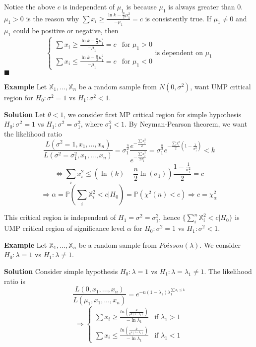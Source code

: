 Notice the above $c$ is independent of $\mu_1$ is because $\mu_1$ is always greater than 0. $\mu_1 > 0$ is the reason why $\sum x_i \geq \frac{\ln k - \frac{n}{2}\mu_1^2}{-\mu_1} = c$ is consistently true. If $\mu_1 \neq 0$ and $\mu_1$ could be positive or negative, then
$$\begin{cases}
\sum x_i \geq \frac{\ln k - \frac{n}{2}\mu_1^2}{-\mu_1} = c & \text{for } \mu_1 >  0 \\
\sum x_i \leq \frac{\ln k - \frac{n}{2}\mu_1^2}{-\mu_1} = c & \text{for } \mu_1 <  0
\end{cases} \text{is dependent on } \mu_1$$
$\blacksquare$

\textbf{Example} Let $\mathbb{X}_1, ..., \mathbb{X}_n$ be a random sample from $N(0, \sigma^2)$, want UMP critical region for $H_0: \sigma^2 = 1$ vs $H_1: \sigma^2 < 1$.

\textbf{Solution} Let $\theta < 1$, we consider first MP critical region for simple hypothesis $H_0: \sigma^2 = 1$ vs $H_1: \sigma^2 = \sigma_1^2$, where $\sigma_1^2 < 1$. By Neyman-Pearson theorem, we want the likelihood ratio
$$\frac{L(\sigma^2 = 1, x_1, ..., x_n)}{L(\sigma^2 = \sigma_1^2, x_1, ..., x_n)} = \sigma_1^{\frac{n}{2}}\frac{e^{-\frac{\sum x_i^2}{2}}}{e^{-\frac{\sum x_i^2}{2\sigma_1^2}}}
= \sigma_1^{\frac{n}{2}} e^{-\frac{\sum x_i^2}{2} (1-\frac{1}{\sigma_1^2})} < k$$
$$\iff \sum_i x_i^2 \leq (\ln(k) - \frac{n}{2}\ln(\sigma_1)) \frac{1-\frac{1}{\sigma_1^2}}{2} = c$$
$$\Rightarrow \alpha = \mathbb{P}(\sum_i \mathbb{X}_i^2 < c | H_0) = \mathbb{P}(\chi^2(n) < c ) \Rightarrow c = \chi^2_\alpha$$

This critical region is independent of $H_1 = \sigma^2 = \sigma_1^2$, hence $\{ \sum_i^n \mathbb{X}_i^2 < c | H_0 \}$ is UMP critical region of significance level $\alpha$ for $H_0: \sigma^2 = 1$ vs $H_1: \sigma^2 < 1$.

\textbf{Example} Let $\mathbb{X}_1, ..., \mathbb{X}_n$ be a random sample from $Poisson(\lambda)$. We consider $H_0: \lambda = 1$ vs $H_1: \lambda \neq 1$.

\textbf{Solution} Consider simple hypothesis $H_0: \lambda = 1$ vs $H_1: \lambda = \lambda_1 \neq 1$. The likelihood ratio is
$$\frac{L(0, x_1, ..., x_n)}{L(\mu_1, x_1, ..., x_n)} = e^{-n(1-\lambda_1) \lambda_1^{\sum x_i \leq k}}$$
$$\Rightarrow
\begin{cases}
\sum x_i \geq \frac{ln(\frac{k}{e^{n(1-\lambda_1)}})}{-\ln \lambda_1} & \text{if } \lambda_1 > 1 \\
\sum x_i \leq \frac{ln(\frac{k}{e^{n(1-\lambda_1)}})}{-\ln \lambda_1} & \text{if } \lambda_1 < 1
\end{cases}$$

